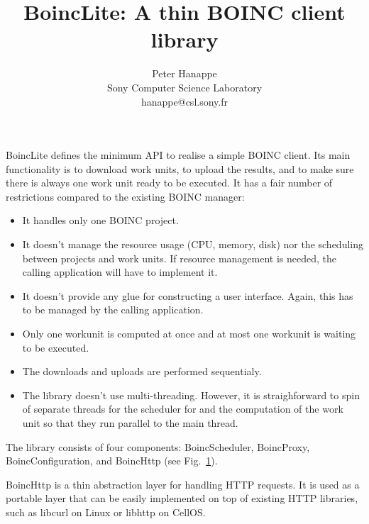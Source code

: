 \documentclass[a4paper,11pt]{article}
\author{Peter Hanappe \\ Sony Computer Science Laboratory \\ hanappe@csl.sony.fr}
\title{BoincLite: A thin BOINC client library}
\begin{document}
\maketitle
  
BoincLite defines the minimum API to realise a simple BOINC
client. Its main functionality is to download work units, to upload
the results, and to make sure there is always one work unit ready to
be executed. It has a fair number of restrictions compared to the
existing BOINC manager:

\begin{itemize}

\item It handles only one BOINC project.

\item It doesn't manage the resource usage (CPU, memory, disk) nor the
  scheduling between projects and work units. If resource management
  is needed, the calling application will have to implement it.

\item It doesn't provide any glue for constructing a user
  interface. Again, this has to be managed by the calling application.

\item Only one workunit is computed at once and at most one workunit
  is waiting to be executed.

\item The downloads and uploads are performed sequentialy.

\item The library doesn't use multi-threading. However, it is
  straighforward to spin of separate threads for the scheduler for and
  the computation of the work unit so that they run parallel to the
  main thread.

\end{itemize}

\begin{figure}[h!]
  \label{fig:components}
  \vspace{10pt}
\end{figure}

The library consists of four components: BoincScheduler, BoincProxy,
BoincConfiguration, and BoincHttp (see Fig.~\ref{fig:components}).

BoincHttp is a thin abstraction layer for handling HTTP requests. It
is used as a portable layer that can be easily implemented on top of
existing HTTP libraries, such as libcurl on Linux or libhttp on
CellOS.
\end{document}
